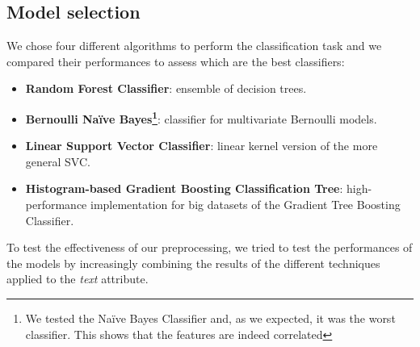 \documentclass[conference]{IEEEtran}
\begin{document}
\subsection{Model selection}\label{sec:model}
We chose four different algorithms to perform the classification task and we compared their performances to assess which are the best classifiers:
\begin{itemize}
    \item \textbf{Random Forest Classifier\cite{rf}}: ensemble of decision trees.
    \item \textbf{Bernoulli Naïve Bayes\cite{bnb}\footnote{We tested the Naïve Bayes Classifier and, as we expected, it was the worst classifier. This shows that the features are indeed correlated}}: classifier for multivariate Bernoulli\cite{bernoulli} models.
    \item \textbf{Linear Support Vector Classifier\cite{svc}}: linear kernel version of the more general SVC.
    \item \textbf{Histogram-based Gradient Boosting Classification Tree\cite{histgtb}}: high-performance implementation for big datasets of the Gradient Tree Boosting Classifier\cite{gtb}. 
\end{itemize}
To test the effectiveness of our preprocessing, we tried to test the performances of the models by increasingly combining the results of the different techniques applied to the \textit{text} attribute. 
\end{document}
